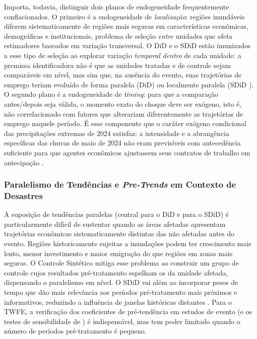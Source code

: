 \documentclass[a4paper,12pt]{article}
\begin{document}
Importa, todavia, distinguir dois planos de endogeneidade frequentemente conflacionados.
O primeiro é a endogeneidade de \emph{localização}: regiões inundáveis diferem
sistematicamente de regiões mais seguras em características econômicas, demográficas e
institucionais, problema de seleção \emph{entre} unidades que afeta estimadores
baseados em variação transversal. O DiD e o SDiD estão imunizados a esse tipo de
seleção ao explorar variação \emph{temporal dentro} de cada unidade: a premissa
identificadora não é que as unidades tratadas e de controle sejam comparáveis em
nível, mas sim que, na ausência do evento, suas trajetórias de emprego teriam evoluído
de forma paralela (DiD) ou localmente paralela (SDiD \cite{arkhangelsky2021}). O segundo
plano é a endogeneidade de \emph{timing}: para que a comparação antes/depois seja
válida, o momento exato do choque deve ser exógeno, isto é, não correlacionado com fatores
que alterariam diferentemente as trajetórias de emprego naquele período. É esse
componente que o caráter exógeno condicional das precipitações extremas de 2024 satisfaz:
a intensidade e a abrangência específicas das chuvas de maio de 2024 não eram
previsíveis com antecedência suficiente para que agentes econômicos ajustassem seus
contratos de trabalho em antecipação \cite{elsner2024}.

\subsubsection{Paralelismo de Tendências e \textit{Pre-Trends} em Contexto de
Desastres}

A suposição de tendências paralelas (central para o DiD e para o SDiD) é
particularmente difícil de sustentar quando as áreas afetadas apresentam trajetórias
econômicas sistematicamente distintas das não afetadas antes do evento. Regiões
historicamente sujeitas a inundações podem ter crescimento mais lento, menor
investimento e maior emigração do que regiões em zonas mais seguras. O Controle
Sintético mitiga esse problema ao construir um grupo de controle cujos resultados
pré-tratamento espelham os da unidade afetada, dispensando o paralelismo em nível. O
SDiD vai além ao incorporar pesos de tempo que dão mais relevância aos períodos
pré-tratamento mais próximos e informativos, reduzindo a influência de janelas históricas
distantes \cite{arkhangelsky2021}. Para o TWFE, a verificação dos coeficientes de
pré-tendência em estudos de evento (e os testes de sensibilidade de )
é indispensável, mas tem poder limitado quando o número de períodos pré-tratamento é
pequeno.
\end{document}
